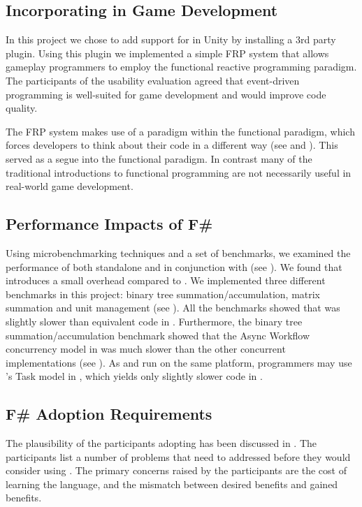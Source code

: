 \subsection{Incorporating \fs in Game Development}
In this project we chose to add support for \fs in Unity by installing a 3rd party plugin. Using this plugin we implemented a simple \gls{FRP} system that allows gameplay programmers to employ the functional reactive programming paradigm. The participants of the usability evaluation agreed that event-driven programming is well-suited for game development and would improve code quality.

The \gls{FRP} system makes use of a paradigm within the functional paradigm, which forces developers to think about their code in a different way (see  and ). This served as a segue into the functional paradigm. In contrast many of the traditional introductions to functional programming are not necessarily useful in real-world game development.

\subsection{Performance Impacts of F\#}
Using microbenchmarking techniques and a set of benchmarks, we examined the performance of \fs both standalone and in conjunction with \unity (see ). We found that \fs introduces a small overhead compared to \cs. %
We implemented three different benchmarks in this project: binary tree summation/accumulation, matrix summation and unit management (see ). All the benchmarks showed that \fs was slightly slower than equivalent code in \cs. Furthermore, the binary tree summation/accumulation benchmark showed that the Async Workflow concurrency model in \fs was much slower than the other concurrent implementations (see ). As \cs and \fs run on the same platform, programmers may use \cs's Task model in \fs, which yields only slightly slower code in \fs.

\subsection{F\# Adoption Requirements}
The plausibility of the participants adopting \fs has been discussed in . The participants list a number of problems that need to addressed before they would consider using \fs. The primary concerns raised by the participants are the cost of learning the language, and the mismatch between desired benefits and gained benefits.


